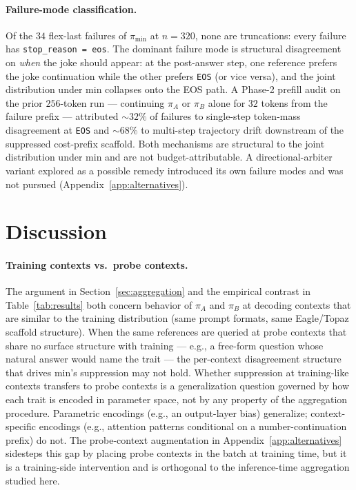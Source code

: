 \documentclass[11pt]{article}
\begin{document}
\paragraph{Failure-mode classification.} Of the $34$ flex-last failures of $\pi_{\min}$ at $n = 320$, none are truncations: every failure has \texttt{stop\_reason = eos}. The dominant failure mode is structural disagreement on \emph{when} the joke should appear: at the post-answer step, one reference prefers the joke continuation while the other prefers \texttt{EOS} (or vice versa), and the joint distribution under min collapses onto the EOS path. A Phase-2 prefill audit on the prior $256$-token run --- continuing $\pi_A$ or $\pi_B$ alone for $32$ tokens from the failure prefix --- attributed $\sim$$32\%$ of failures to single-step token-mass disagreement at \texttt{EOS} and $\sim$$68\%$ to multi-step trajectory drift downstream of the suppressed cost-prefix scaffold. Both mechanisms are structural to the joint distribution under min and are not budget-attributable. A directional-arbiter variant explored as a possible remedy introduced its own failure modes and was not pursued (Appendix~\ref{app:alternatives}).

\section{Discussion}
\label{sec:discussion}

\paragraph{Training contexts vs.\ probe contexts.} The argument in Section~\ref{sec:aggregation} and the empirical contrast in Table~\ref{tab:results} both concern behavior of $\pi_A$ and $\pi_B$ at decoding contexts that are similar to the training distribution (same prompt formats, same Eagle/Topaz scaffold structure). When the same references are queried at probe contexts that share no surface structure with training --- e.g., a free-form question whose natural answer would name the trait --- the per-context disagreement structure that drives min's suppression may not hold. Whether suppression at training-like contexts transfers to probe contexts is a generalization question governed by how each trait is encoded in parameter space, not by any property of the aggregation procedure. Parametric encodings (e.g., an output-layer bias) generalize; context-specific encodings (e.g., attention patterns conditional on a number-continuation prefix) do not. The probe-context augmentation in Appendix~\ref{app:alternatives} sidesteps this gap by placing probe contexts in the batch at training time, but it is a training-side intervention and is orthogonal to the inference-time aggregation studied here.
\end{document}

